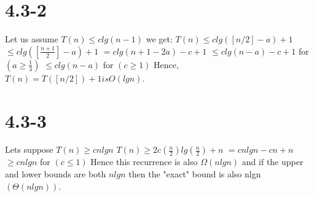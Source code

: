 \documentclass[12pt]{article}
\newcommand\tab[1][1cm]{\hspace*{#1}}
\begin{document}
\section{4.3-2}
Let us assume $T(n)\leq clg(n-1)$ we get: \newline
$T(n)\leq clg([n/2]-a)+1$ \newline
\tab $\leq clg([\frac{n+1}{2}]-a)+1$ \newline
\tab $=clg(n+1-2a)-c+1$ \newline
\tab $\leq clg(n-a)-c+1$ for $(a\geq \frac{1}{3})$ \newline
\tab $\leq clg(n-a)$ for $(c\geq 1)$ \newline
Hence, $T(n)=T([n/2])+1 is O(lgn)$.

\section{4.3-3}
Lets suppose $T(n)\geq cnlgn$ \newline
$T(n)\geq 2c(\frac{n}{2})lg(\frac{n}{2})+n$ \newline
\tab $=cnlgn-cn+n$ \newline
\tab $\geq cnlgn$ for $(c\leq 1)$ \newline
Hence this recurrence is also $\Omega(nlgn)$ and if the upper and lower bounds are both $nlgn$ then the "exact" bound is also nlgn $(\Theta(nlgn))$.
\end{document}
